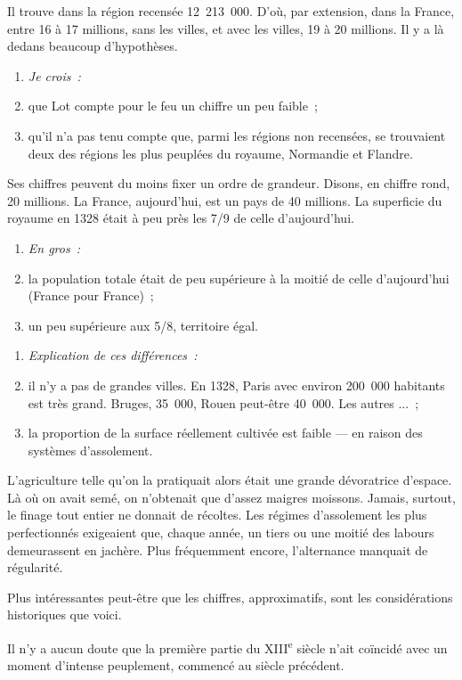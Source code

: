 \documentclass[french,twoside]{book} %
\newlength{\listmod}
\newcommand{\listhead}[1]{\hspace{-1\listmod}\emph{#1}}
\begin{document}
\noindent Il trouve dans la région recensée 12 213 000. D’où, par extension, dans la France, entre 16 à 17 millions, sans les villes, et avec les villes, 19 à 20 millions. Il y a là dedans beaucoup d’hypothèses.\par

\begin{enumerate}[itemsep=0pt,]
\item[]\listhead{Je crois :}
\item que Lot compte pour le feu un chiffre un peu faible ;
\item qu’il n’a pas tenu compte que, parmi les régions non recensées, se trouvaient deux des régions les plus peuplées du royaume, Normandie et Flandre.
\end{enumerate}

\noindent Ses chiffres peuvent du moins fixer un ordre de grandeur. Disons, en chiffre rond, 20 millions. La France, aujourd’hui, est un pays de 40 millions. La superficie du royaume en 1328 était à peu près les 7/9 de celle d’aujourd’hui.\par

\begin{enumerate}[itemsep=0pt,]
\item[]\listhead{En gros :}
\item la population totale était de peu supérieure à la moitié de celle d’aujourd’hui (France pour France) ;
\item un peu supérieure aux 5/8, territoire égal.
\end{enumerate}

\label{p9}
\begin{enumerate}[itemsep=0pt,]
\item[]\listhead{Explication de ces différences :}
\item il n’y a pas de grandes villes. En 1328, Paris avec environ 200 000 habitants est très grand. Bruges, 35 000, Rouen peut-être 40 000. Les autres ... ;
\item la proportion de la surface réellement cultivée est faible — en raison des systèmes d’assolement.
\end{enumerate}

\noindent L’agriculture telle qu’on la pratiquait alors était une grande dévoratrice d’espace. Là où on avait semé, on n’obtenait que d’assez maigres moissons. Jamais, surtout, le finage tout entier ne donnait de récoltes. Les régimes d’assolement les plus perfectionnés exigeaient que, chaque année, un tiers ou une moitié des labours demeurassent en jachère. Plus fréquemment encore, l’alternance manquait de régularité.\par
Plus intéressantes peut-être que les chiffres, approximatifs, sont les considérations historiques que voici.\par
Il n’y a aucun doute que la première partie du XIII\textsuperscript{e} siècle n’ait coïncidé avec un moment d’intense peuplement, commencé au siècle précédent.\par
\end{document}
